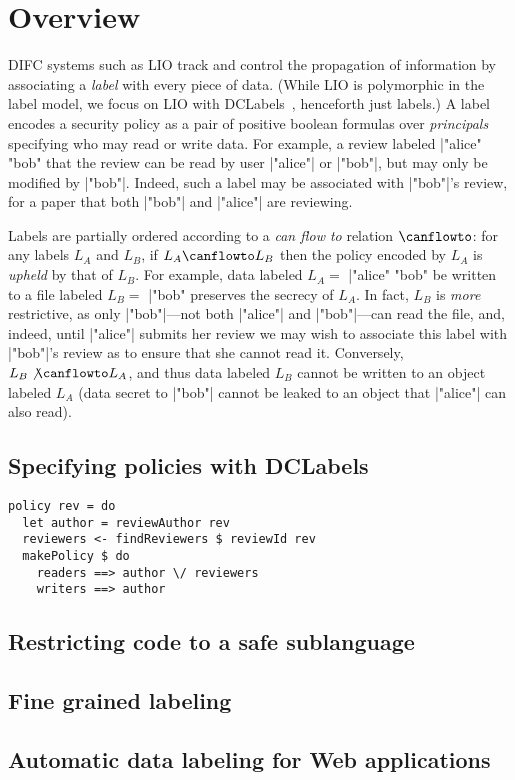 \section{Overview}
\label{sec:overview}

DIFC systems such as LIO track and control the propagation of
information by associating a \emph{label} with every piece of data.
%
(While LIO is polymorphic in the label model, we focus on LIO with
DCLabels~\cite{dclabels}, henceforth just labels.)
%
A label encodes a security policy as a pair of positive boolean
formulas over \emph{principals} specifying who may read or write data.
%
For example, a review labeled \hs|"alice" \/ "bob" %
that the review can be read by user \hs|"alice"| or \hs|"bob"|, but
may only be modified by \hs|"bob"|.
%
Indeed, such a label may be associated with \hs|"bob"|'s review, for a
paper that both \hs|"bob"| and \hs|"alice"| are reviewing.
%

Labels are partially ordered according to a {\em can flow
  to} relation $\canflowto$: for any labels $L_A$ and $L_B$, if $L_A
  \canflowto L_B$ then the policy encoded by $L_A$ is \emph{upheld}
  by that of $L_B$.
%
For example, data labeled $L_A =$ \hs|"alice" \/ "bob" %
be written to a file labeled $L_B =$ \hs|"bob" %
preserves the secrecy of $L_A$.
%
In fact, $L_B$ is \emph{more} restrictive, as only
\hs|"bob"|---not both \hs|"alice"| and \hs|"bob"|---can read the file,
and, indeed, until \hs|"alice"| submits her review we may wish to
associate this label with \hs|"bob"|'s review as to ensure that she
cannot read it.
%
Conversely, $L_B \not\canflowto L_A$, and thus data labeled $L_B$
cannot be written to an object labeled $L_A$ (data secret to
\hs|"bob"| cannot be leaked to an object that \hs|"alice"| can also
read).


\subsection{Specifying policies with DCLabels}

\begin{verbatim}
policy rev = do
  let author = reviewAuthor rev
  reviewers <- findReviewers $ reviewId rev
  makePolicy $ do
    readers ==> author \/ reviewers
    writers ==> author
\end{verbatim}

\subsection{Restricting code to a safe sublanguage}
\subsection{Fine grained labeling}
\subsection{Automatic data labeling for Web applications}
